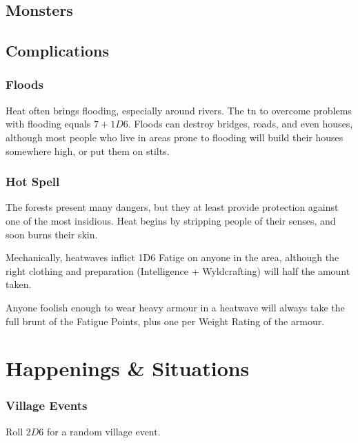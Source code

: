 \begin{multicols}{2}
\subsection{Monsters}
\label{monsterEncounters}

\encMonsters

\subsection{Complications}

\subsubsection{Floods}

Heat often brings flooding, especially around rivers.
The \gls{tn} to overcome problems with flooding equals $7 + 1D6$.
Floods can destroy bridges, roads, and even houses, although most people who live in areas prone to flooding will build their houses somewhere high, or put them on stilts.

\subsubsection{Hot Spell}

The forests present many dangers, but they at least provide protection against one of the most insidious.
Heat begins by stripping people of their senses, and soon burns their skin.

Mechanically, heatwaves inflict 1D6 Fatige on anyone in the area, although the right clothing and preparation (Intelligence + Wyldcrafting) will half the amount taken.

Anyone foolish enough to wear heavy armour in a heatwave will always take the full brunt of the Fatigue Points, plus one per Weight Rating of the armour.

\end{multicols}

\section{Happenings \& Situations}

\begin{multicols}{2}

\subsubsection{Village Events}

Roll $2D6$ for a random village event.

\encVillageEvent

\end{multicols}

